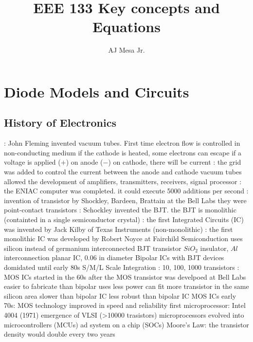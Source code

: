 \documentclass[a4paper,11pt]{article}
\title{\textbf{EEE 133 Key concepts and Equations}}
\author{AJ Mesa Jr.}
\begin{document}
	\maketitle
	\section{Diode Models and Circuits}
	\subsection{History of Electronics}
	\begin{outline}[enumerate]
		: John Fleming invented vacuum tubes. First time electron flow is controlled in non-conducting medium
			\2 if the cathode is heated, some electrons can escape 
			\2 if a voltage is applied ($+$) on anode ($-$) on cathode, there will be current 
		: the grid was added to control the current between the anode and cathode
			\2 vacuum tubes allowed the development of amplifiers, transmitters, receivers, signal processor
		: the ENIAC computer was completed. it could execute 5000 additions per second
		: invention of transistor by Shockley, Bardeen, Brattain at the Bell Labs
			\2 they were point-contact transistors
		: Schockley invented the BJT. the BJT is monolithic (containted in a single semiconductor crystal)	
		: the first Integrated Circuits (IC) was invented by Jack Kilby of Texas Instruments (non-monolithic) 
		: the first monolithic IC was developed by Robert Noyce at Fairchild Semiconduction
			\2 uses silicon instead of germanium
			 interconnected BJT transistor
			\2 $SiO_{2}$ insulator, $Al$ interconnection
			\2 planar IC, 0.06 in diameter
		\1 Bipolar ICs with BJT devices domidated until early 80s	
			\2 S/M/L Scale Integration : 10, 100, 1000 transistors
		: MOS ICs started in the 60s after the MOS transistor was develpoed at Bell Labs
			\2 easier to fabricate than bipolar 
			\2 uses less power
			\2 can fit more transistor in the same silicon area
			\2 slower than bipolar IC
			\2 less robust than bipolar IC
		\1 MOS ICs
			\2 early 70s: MOS technology improved in speed and reliability
			\2 first microprocessor: Intel 4004 (1971)
			\2 emergence of VLSI (>10000 trasistors)
			\2 microprocessors evolved into microcontrollers (MCUs) ad system on a chip (SOCs)
		\1 Moore's Law: the transistor density would double every two years
	\end{outline}
\end{document}
